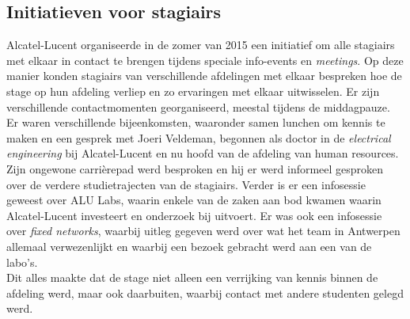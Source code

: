 \documentclass[10pt,a4paper]{article}
\begin{document}
\subsection{Initiatieven voor stagiairs}
\label{interns}
Alcatel-Lucent organiseerde in de zomer van 2015 een initiatief om alle stagiairs met elkaar in contact te brengen tijdens speciale info-events en \textit{meetings}. Op deze manier konden stagiairs van verschillende afdelingen met elkaar bespreken hoe de stage op hun afdeling verliep en zo ervaringen met elkaar uitwisselen. Er zijn verschillende contactmomenten georganiseerd, meestal tijdens de middagpauze. Er waren verschillende bijeenkomsten, waaronder samen lunchen om kennis te maken en een gesprek met Joeri Veldeman, begonnen als doctor in de \textit{electrical engineering} bij Alcatel-Lucent en nu hoofd van de afdeling van human resources. Zijn ongewone carri\`erepad werd besproken en hij er werd informeel gesproken over de verdere studietrajecten van de stagiairs.
Verder is er een infosessie geweest over ALU Labs, waarin enkele van de zaken aan bod kwamen waarin Alcatel-Lucent investeert en onderzoek bij uitvoert. Er was ook een infosessie over \textit{fixed networks}, waarbij uitleg gegeven werd over wat het team in Antwerpen allemaal verwezenlijkt en waarbij een bezoek gebracht werd aan een van de labo's.\\
Dit alles maakte dat de stage niet alleen een verrijking van kennis binnen de afdeling werd, maar ook daarbuiten, waarbij contact met andere studenten gelegd werd.
\end{document}
